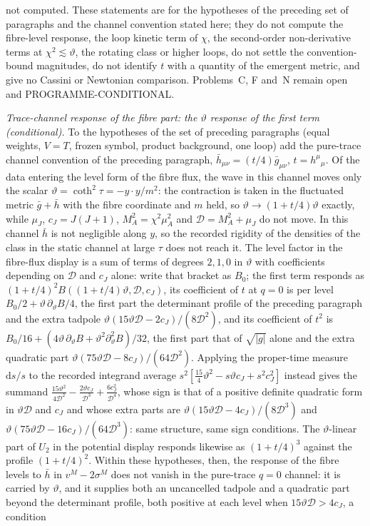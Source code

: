 not computed. These statements are for the hypotheses of the preceding set of paragraphs and the channel convention stated here; they do not compute the fibre-level response, the loop kinetic term of \(\chi\), the second-order non-derivative terms at \(\chi^2\lesssim\vartheta\), the rotating class or higher loops, do not settle the convention-bound magnitudes, do not identify \(t\) with a quantity of the emergent metric, and give no Cassini or Newtonian comparison. Problems~C, F and~N remain open and PROGRAMME-CONDITIONAL.

\emph{Trace-channel response of the fibre part: the \(\vartheta\) response of the first term (conditional).} To the hypotheses of the set of preceding paragraphs (equal weights, \(V=T\), frozen symbol, product background, one loop) add the pure-trace channel convention of the preceding paragraph, \(\bar h_{\mu\nu}=(t/4)\bar g_{\mu\nu}\), \(t=h^\mu{}_\mu\). Of the data entering the level form of the fibre flux, the wave in this channel moves only the scalar \(\vartheta=\coth^2\tau=-y\cdot y/m^2\): the contraction is taken in the fluctuated metric \(\bar g+\bar h\) with the fibre coordinate and \(m\) held, so \(\vartheta\to(1+t/4)\vartheta\) exactly, while \(\mu_J\), \(c_J=J(J+1)\), \(M_A^2=\chi^2\mu_A^2\) and \(\mathcal D=M_A^2+\mu_J\) do not move. In this channel \(\bar h\) is not negligible along \(y\), so the recorded rigidity of the densities of the class in the static channel at large \(\tau\) does not reach it. The level factor in the fibre-flux display is a sum of terms of degrees \(2,1,0\) in \(\vartheta\) with coefficients depending on \(\mathcal D\) and \(c_J\) alone: write that bracket as \(B_0\); the first term responds as \((1+t/4)^2B((1+t/4)\vartheta,\mathcal D,c_J)\), its coefficient of \(t\) at \(q=0\) is per level \(B_0/2+\vartheta\,\partial_\vartheta B/4\), the first part the determinant profile of the preceding paragraph and the extra tadpole \(\vartheta(15\vartheta\mathcal D-2c_J)/(8\mathcal D^2)\), and its coefficient of \(t^2\) is \(B_0/16+(4\vartheta\,\partial_\vartheta B+\vartheta^2\partial_\vartheta^2B)/32\), the first part that of \(\sqrt{|g|}\) alone and the extra quadratic part \(\vartheta(75\vartheta\mathcal D-8c_J)/(64\mathcal D^2)\). Applying the proper-time measure \(\mathrm ds/s\) to the recorded integrand average \(s^2[\tfrac{15}4\vartheta^2-s\vartheta c_J+s^2c_J^2]\) instead gives the summand \(\tfrac{15\vartheta^2}{4\mathcal D^2}-\tfrac{2\vartheta c_J}{\mathcal D^3}+\tfrac{6c_J^2}{\mathcal D^4}\), whose sign is that of a positive definite quadratic form in \(\vartheta\mathcal D\) and \(c_J\) and whose extra parts are \(\vartheta(15\vartheta\mathcal D-4c_J)/(8\mathcal D^3)\) and \(\vartheta(75\vartheta\mathcal D-16c_J)/(64\mathcal D^3)\): same structure, same sign conditions. The \(\vartheta\)-linear part of \(U_2\) in the potential display responds likewise as \((1+t/4)^3\) against the profile \((1+t/4)^2\). Within these hypotheses, then, the response of the fibre levels to \(\bar h\) in \(v^M-2\sigma^M\) does not vanish in the pure-trace \(q=0\) channel: it is carried by \(\vartheta\), and it supplies both an uncancelled tadpole and a quadratic part beyond the determinant profile, both positive at each level when \(15\vartheta\mathcal D>4c_J\), a condition 